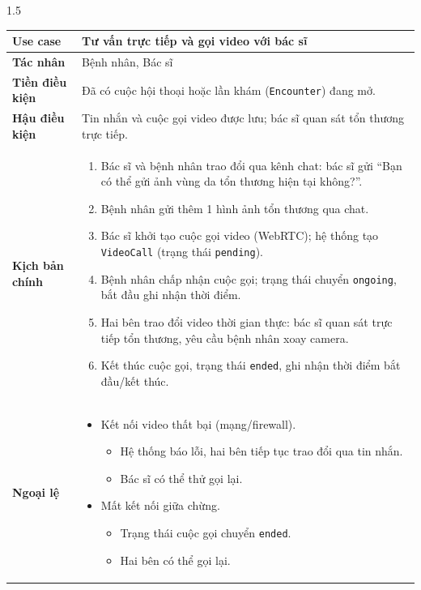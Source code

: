 \begin{spacing}{1.5}
\renewcommand{\arraystretch}{1.15}
\begin{longtable}{|>{\raggedright\arraybackslash}p{}|>{\raggedright\arraybackslash}p{}|}
\hline
\textbf{Use case} & Tư vấn trực tiếp và gọi video với bác sĩ \\ \hline
\textbf{Tác nhân} & Bệnh nhân, Bác sĩ \\ \hline
\textbf{Tiền điều kiện} & Đã có cuộc hội thoại hoặc lần khám (\texttt{Encounter}) đang mở. \\ \hline
\textbf{Hậu điều kiện} & Tin nhắn và cuộc gọi video được lưu; bác sĩ quan sát tổn thương trực tiếp. \\ \hline
\textbf{Kịch bản chính} &
\begin{enumerate}[nosep,leftmargin=*]
  \item Bác sĩ và bệnh nhân trao đổi qua kênh chat: bác sĩ gửi ``Bạn có thể gửi ảnh vùng da tổn thương hiện tại không?''.
  \item Bệnh nhân gửi thêm 1 hình ảnh tổn thương qua chat.
  \item Bác sĩ khởi tạo cuộc gọi video (WebRTC); hệ thống tạo \texttt{VideoCall} (trạng thái \texttt{pending}).
  \item Bệnh nhân chấp nhận cuộc gọi; trạng thái chuyển \texttt{ongoing}, bắt đầu ghi nhận thời điểm.
  \item Hai bên trao đổi video thời gian thực: bác sĩ quan sát trực tiếp tổn thương, yêu cầu bệnh nhân xoay camera.
  \item Kết thúc cuộc gọi, trạng thái \texttt{ended}, ghi nhận thời điểm bắt đầu/kết thúc.
\end{enumerate} \\ \hline
\textbf{Ngoại lệ} &
\begin{itemize}[nosep,leftmargin=2.6em,labelwidth=2em,labelsep=0.5em,align=left]
  \item[3.] Kết nối video thất bại (mạng/firewall).
  \begin{itemize}[nosep,leftmargin=3em,labelwidth=2.4em,labelsep=0.4em,align=left]
    \item[3.1] Hệ thống báo lỗi, hai bên tiếp tục trao đổi qua tin nhắn.
    \item[3.2] Bác sĩ có thể thử gọi lại.
  \end{itemize}
  \item[5.] Mất kết nối giữa chừng.
  \begin{itemize}[nosep,leftmargin=3em,labelwidth=2.4em,labelsep=0.4em,align=left]
    \item[5.1] Trạng thái cuộc gọi chuyển \texttt{ended}.
    \item[5.2] Hai bên có thể gọi lại.
  \end{itemize}
\end{itemize} \\ \hline
\end{longtable}
\end{spacing}

